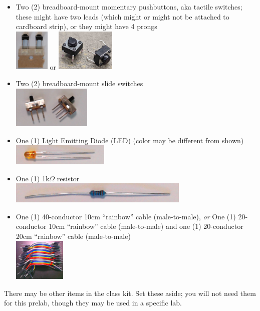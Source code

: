 \begin{itemize}
    \item Two (2) breadboard-mount momentary pushbuttons, aka tactile switches;
        these might have two leads (which might or might not be attached to cardboard strip), or they might have 4 prongs \\
        \includegraphics[height=2cm]{inventory/buttons-2pin} \hspace{1cm} or
        \hspace{1cm} \includegraphics[height=2cm]{inventory/buttons-4pin}
    \item Two (2) breadboard-mount slide switches \\
        \includegraphics[height=2cm]{inventory/sliders-spdt}%
    \displaymoduleitem
    \item One (1) Light Emitting Diode (LED) (color may be different from shown) \\
        \includegraphics[height=1cm]{inventory/led}
    \item One (1) 1k$\Omega$ resistor \\
        \includegraphics[height=1cm]{inventory/resistor}
    \item One (1) 40-conductor 10cm ``rainbow'' cable (male-to-male), \textit{or} One (1) 20-conductor 10cm ``rainbow'' cable (male-to-male) and one (1) 20-conductor 20cm ``rainbow'' cable (male-to-male) \\
        \includegraphics[height=2cm]{inventory/mm-cable}
    \fmcableitem
\end{itemize}

There may be other items in the class kit.
Set these aside;
you will not need them for this prelab, though they may be used in a specific lab.
